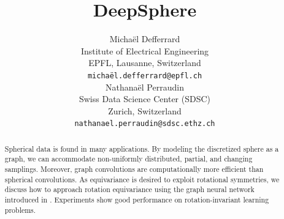 \documentclass{article} %
\title{DeepSphere}
\author{Michaël Defferrard \\
Institute of Electrical Engineering \\
EPFL, Lausanne, Switzerland \\
\texttt{michaël.defferrard@epfl.ch} \\
\And
Nathanaël Perraudin \\
Swiss Data Science Center (SDSC) \\
Zurich, Switzerland \\
\texttt{nathanael.perraudin@sdsc.ethz.ch} \\
}
\newcommand{\1}{\b{1}}              %
\newcommand{\0}{\b{0}}              %
\begin{document}
\maketitle

\begin{abstract}
	Spherical data is found in many applications.
	By modeling the discretized sphere as a graph, we can accommodate non-uniformly distributed, partial, and changing samplings.
	Moreover, graph convolutions are computationally more efficient than spherical convolutions.
	As equivariance is desired to exploit rotational symmetries, we discuss how to approach rotation equivariance using the graph neural network introduced in \citet{defferrard2016convolutional}.
	Experiments show good performance on rotation-invariant learning problems.
\end{abstract}
\end{document}
